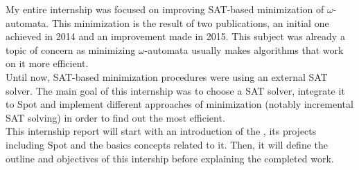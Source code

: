 My entire internship was focused on improving SAT-based minimization of $\omega$-automata. This minimization
is the result of two publications, an initial one achieved in 2014 and an improvement made in 2015.
This subject was already a topic of concern as minimizing $\omega$-automata usually makes algorithms that
work on it more efficient.\\

Until now, SAT-based minimization procedures were using an external SAT solver. The main goal of this
internship was to choose a SAT solver, integrate it to Spot and implement different approaches of
minimization (notably incremental SAT solving) in order to find out the most efficient.\\

This internship report will start with an introduction of the \LRDE\space, its projects including Spot and
the basics concepts related to it. Then, it will define the outline and objectives of this intership before
explaining the completed work.
